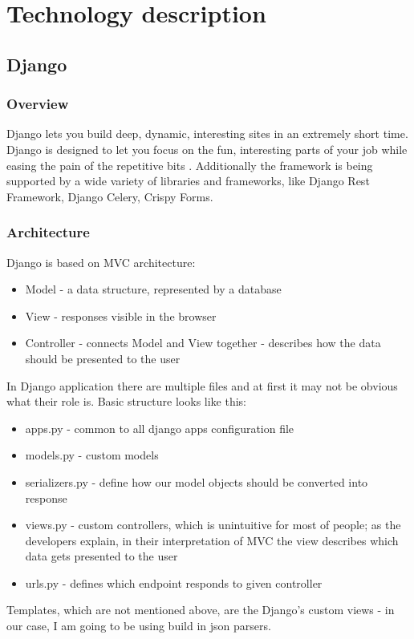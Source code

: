 
\chapter{Technology description}

\section{Django}

\subsection{Overview}
Django lets you build deep, dynamic, interesting sites in an extremely short time. Django is designed to let you focus on the fun, interesting parts of your job while easing the pain of the repetitive bits \cite{djangobook}. Additionally the framework is being supported by a wide variety of libraries and frameworks, like Django Rest Framework, Django Celery, Crispy Forms.

\subsection{Architecture}
Django is based on MVC architecture:
\begin{itemize}
    \item Model - a data structure, represented by a database
    \item View - responses visible in the browser
    \item Controller - connects Model and View together - describes how the data should be presented to the user
\end{itemize}
In Django application there are multiple files and at first it may not be obvious what their role is. Basic structure looks like this:
\begin{itemize}
    \item apps.py - common to all django apps configuration file
    \item models.py - custom models
    \item serializers.py - define how our model objects should be converted into response
    \item views.py - custom controllers, which is unintuitive for most of people; as the developers explain, in their interpretation of MVC the view describes which data gets presented to the user \cite{djangoWhyViews}
    \item urls.py - defines which endpoint responds to given controller
\end{itemize}
Templates, which are not mentioned above, are the Django's custom views - in our case, I am going to be using build in json parsers.

